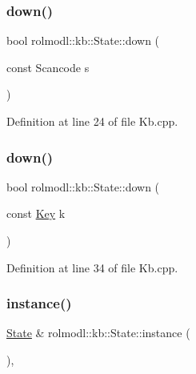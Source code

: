 \subsubsection{\texorpdfstring{down()}{down()}\hspace{0.1cm}{\footnotesize\ttfamily [1/2]}}
{\footnotesize\ttfamily bool rolmodl\+::kb\+::\+State\+::down (\begin{DoxyParamCaption}\item[{const Scancode}]{s }\end{DoxyParamCaption})\hspace{0.3cm}{\ttfamily [static]}}



Definition at line 24 of file Kb.\+cpp.

\mbox{\label{classrolmodl_1_1rolmodl_1_1kb_1_1_state_aeddbb8cc9b74da6ea1eb5f0d6a6cb717}} 
\subsubsection{\texorpdfstring{down()}{down()}\hspace{0.1cm}{\footnotesize\ttfamily [2/2]}}
{\footnotesize\ttfamily bool rolmodl\+::kb\+::\+State\+::down (\begin{DoxyParamCaption}\item[{const \mbox{\hyperlink{namespacerolmodl_1_1rolmodl_1_1kb_a188e00b289aeb95ae45fb6bf2923e7e2}{Key}}}]{k }\end{DoxyParamCaption})\hspace{0.3cm}{\ttfamily [static]}}



Definition at line 34 of file Kb.\+cpp.

\mbox{\label{classrolmodl_1_1rolmodl_1_1kb_1_1_state_a4cf4d939c14e12204f27a7cd34a13f61}} 
\subsubsection{\texorpdfstring{instance()}{instance()}}
{\footnotesize\ttfamily \mbox{\hyperlink{classrolmodl_1_1rolmodl_1_1kb_1_1_state}{State}} \& rolmodl\+::kb\+::\+State\+::instance (\begin{DoxyParamCaption}{ }\end{DoxyParamCaption})\hspace{0.3cm}{\ttfamily [static]}, {\ttfamily [noexcept]}}



